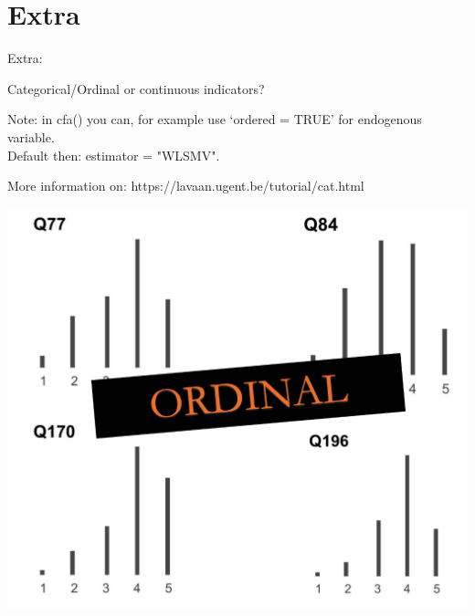 \documentclass[10pt]{beamer}\usepackage[]{graphicx}\usepackage[]{xcolor}
\begin{document}
\section{Extra}

\begin{frame}
	
	\begin{center}
		\Huge{Extra:}
		
		\large{Categorical/Ordinal or continuous indicators?}
	\end{center}
	
	\vspace*{15mm}
	
	Note: in cfa() you can, for example use `ordered = TRUE' for  endogenous variable.\\
	Default then: estimator = "WLSMV".
	
	\vspace*{15mm}
	
	More information on: https://lavaan.ugent.be/tutorial/cat.html
	
\end{frame}

\begin{frame}
	
	\includegraphics[width=\linewidth,height=\textheight,keepaspectratio]{images/slide21.png}
	
\end{frame}

\end{document}
